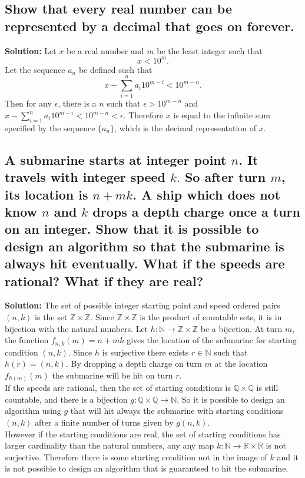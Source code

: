 \documentclass{article}
\newcommand{\exercise}[1]{\subsection{\normalfont #1}}
\newcommand{\solution}{\indent\indent \textbf{Solution: }}
\begin{document}

\exercise{Show that every real number can be represented by a decimal that goes on forever.}
\solution
Let $x$ be a real number and $m$ be the least integer such that 
$$x < 10^m.$$
Let the sequence $a_n$ be defined such that 
$$x- \sum_{i=1}^{n} a_i10^{m-i} < 10^{m-n}.$$
Then for any $\epsilon$, there is a $n$ such that $\epsilon > 10^{m-n}$ and $x - \sum_{i=1}^n a_i10^{m-i} < 10^{m-n} < \epsilon$. Therefore $x$ is equal to the infinite sum specified by the sequence $\{a_n\}$, which is the decimal representation of $x$. 

\exercise{A submarine starts at integer point $n$. It travels with integer speed $k.$ So after turn $m$, its location is $n+mk$. A ship which does not know $n$ and $k$ drops a depth charge once a turn on an integer. Show that it is possible to design an algorithm so that the submarine is always hit eventually. What if the speeds are rational? What if they are real?}
\solution
The set of possible integer starting point and speed ordered pairs $(n, k)$ is the set $\mathbb{Z} \times \mathbb{Z}$. Since $\mathbb{Z}\times \mathbb{Z}$ is the product of countable sets, it is in bijection with the natural numbers. Let $h\colon \mathbb{N}\to \mathbb{Z}\times \mathbb{Z}$ be a bijection. At turn $m$, the function $f_{n,k}(m) = n +mk$ gives the location of the submarine for starting condition $(n, k)$. Since $h$ is surjective there exists $r\in \mathbb{N}$ such that $h(r) = (n, k)$. By dropping a depth charge on turn $m$ at the location $f_{h(m)}(m)$ the submarine will be hit on turn $r$. \\
\indent If the speeds are rational, then the set of starting conditions is $\mathbb{Q} \times \mathbb{Q}$ is still countable, and there is a bijection $g\colon \mathbb{Q}\times \mathbb{Q} \to \mathbb{N}$. So it is possible to design an algorithm using $g$ that will hit always the submarine with starting conditions $(n, k)$ after a finite number of turns given by $g(n, k)$. \\
\indent However if the starting conditions are real, the set of starting conditions has larger cardinality than the natural numbers, any any map $k\colon \mathbb{N} \to \mathbb{R}\times\mathbb{R}$ is not surjective. Therefore there is some starting condition not in the image of $k$ and it is not possible to design an algorithm that is guaranteed to hit the submarine.
\end{document}
